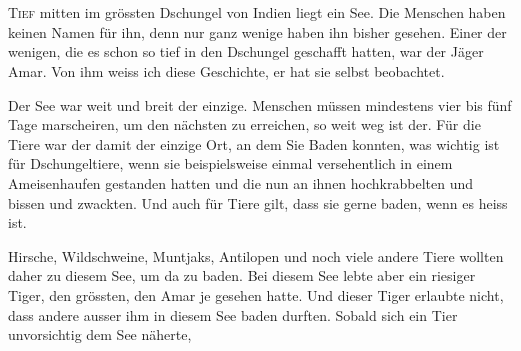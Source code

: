 \chapter*{}
\lettrine[lines=3]{\color{DeepPink}T}{ief} mitten im grössten Dschungel von Indien liegt ein See. Die Menschen haben keinen Namen für ihn, denn nur ganz wenige haben ihn bisher gesehen. Einer der wenigen, die es schon so tief in den Dschungel geschafft hatten, war der Jäger Amar. Von ihm weiss ich diese Geschichte, er hat sie selbst beobachtet.

Der See war weit und breit der einzige. Menschen müssen mindestens vier bis fünf Tage marscheiren, um den nächsten zu erreichen, so weit weg ist der. Für die Tiere war der damit der einzige Ort, an 
dem Sie Baden konnten, was wichtig ist für Dschungeltiere, wenn sie beispielsweise einmal versehentlich in einem Ameisenhaufen gestanden hatten und die nun an ihnen hochkrabbelten und bissen und zwackten. Und auch für Tiere gilt, dass sie gerne baden, wenn es heiss ist.

Hirsche, Wildschweine, Muntjaks, Antilopen und noch viele andere Tiere wollten daher zu diesem See, um da zu baden. Bei diesem See lebte aber ein riesiger Tiger, den grössten, den Amar je gesehen hatte. Und dieser Tiger erlaubte nicht, dass andere ausser ihm in diesem See baden durften. Sobald sich ein Tier unvorsichtig dem See näherte, 


 \hfill {\color{DeepPink}\decofourleft}
